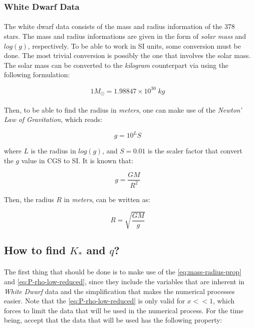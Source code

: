 \documentclass[letterpaper,12pt]{article}
\begin{document}
\subsubsection{White Dwarf Data}

\paragraph{} The white dwarf data consists of the mass and radius information of the 378 stars. The mass and radius informations are given in the form of \textit{solar mass} and $\mathit{log(g)}$, respectively. To be able to work in SI units, some conversion must be done. The most trivial conversion is possibly the one that involves the solar mass. The solar mass can be converted to the \textit{kilogram} counterpart via using the following formulation:

\begin{equation*}
    1 M_\odot = 1.98847 \times 10^{30} \; kg
\end{equation*}

\paragraph{} Then, to be able to find the radius in \textit{meters}, one can make use of the \textit{Newton' Law of Gravitation}, which reads:

\begin{equation*}
    g = 10 ^ {L} S
\end{equation*}

where $L$ is the radius in $\mathit{log(g)}$, and $S = 0.01$ is the scaler factor that convert the $g$ value in CGS to SI. It is known that:

\begin{equation*}
    g = \frac{GM}{R^2}
\end{equation*}

Then, the radius $R$ in \textit{meters}, can be written as:

\begin{equation*}
    R = \sqrt{\frac{GM}{g}}
\end{equation*}


\subsection{How to find $K_*$ and $q$?}
\label{sec:Kq_fit}
\paragraph{} The first thing that should be done is to make use of the \eqref{eq:mass-radius-prop} and \eqref{eq:P-rho-low-reduced}, since they include the variables that are inherent in \textit{White Dwarf} data and the simplification that makes the numerical processes easier. Note that the \eqref{eq:P-rho-low-reduced} is only valid for $x<<1$, which forces to limit the data that will be used in the numerical process. For the time being, accept that the data that will be used has the following property:
\end{document}
